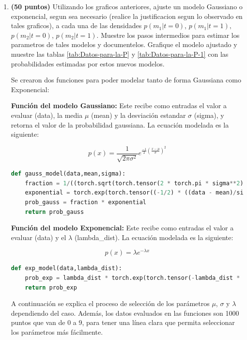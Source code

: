 \documentclass[spanish,english]{article}
\begin{document}
\begin{enumerate}
\item \textbf{(50 puntos)} Utilizando los graficos anteriores, ajuste un
modelo Gaussiano o exponencial, segun sea necesario (realice la justificacion
segun lo observado en tales graficos), a cada una de las densidades
$p\left(m_{1}|t=0\right)$, $p\left(m_{1}|t=1\right),$$p\left(m_{2}|t=0\right)$,
$p\left(m_{2}|t=1\right)$. Muestre los pasos intermedios para estimar
los parametros de tales modelos y documentelos. Grafique el modelo
ajustado y muestre las tablas \foreignlanguage{english}{\ref{tab:Datos-para-la-P}
y \ref{tab:Datos-para-la-P-1}} con las probabilidades estimadas por
estos nuevos modelos.

Se crearon dos funciones para poder modelar tanto de forma Gaussiana como Exponencial:

\textbf{Funci\'{o}n del modelo Gaussiano:} Este recibe como entradas el valor a evaluar (data), la media $\mu$ (mean) y la desviaci\'{o}n estandar $\sigma$ (sigma), y retorna el valor de la probabilidad gaussiana. La ecuaci\'{o}n modelada es la siguiente:

\begin{equation}
    p\left(x\right)=\frac{1}{\sqrt{2\pi\sigma^{2}}}e^{\frac{-1}{2}\left(\frac{x-\mu}{\sigma}\right)^{2}}
\end{equation}\label{eq:func_prob_gauss}

\begin{lstlisting}[language=Python]
def gauss_model(data,mean,sigma):
    fraction = 1/((torch.sqrt(torch.tensor(2 * torch.pi * sigma**2))))
    exponential = torch.exp(torch.tensor((-1/2) * ((data - mean)/sigma)**2))
    prob_gauss = fraction * exponential
    return prob_gauss
\end{lstlisting}

\textbf{Funci\'{o}n del modelo Exponencial:} Este recibe como entradas el valor a evaluar (data) y el $\lambda$ (lambda\_dist). La ecuaci\'{o}n modelada es la siguiente:

\begin{equation}
    p\left(x\right)=\lambda e^{-\lambda x}
\end{equation}\label{eq:func_prob_exp}

\begin{lstlisting}[language=Python]
def exp_model(data,lambda_dist):
    prob_exp = lambda_dist * torch.exp(torch.tensor(-lambda_dist * data))
    return prob_exp
\end{lstlisting}

A continuaci\'{o}n se explica el proceso de selecci\'{o}n de los par\'{a}metros $\mu$, $\sigma$ y $\lambda$ dependiendo del caso. Adem\'{a}s, los datos evaluados en las funciones son 1000 puntos que van de 0 a 9, para tener una l\'{i}nea clara que permita seleccionar los par\'{a}metros m\'{a}s f\'{a}cilmente.


\end{enumerate}
\end{document}
